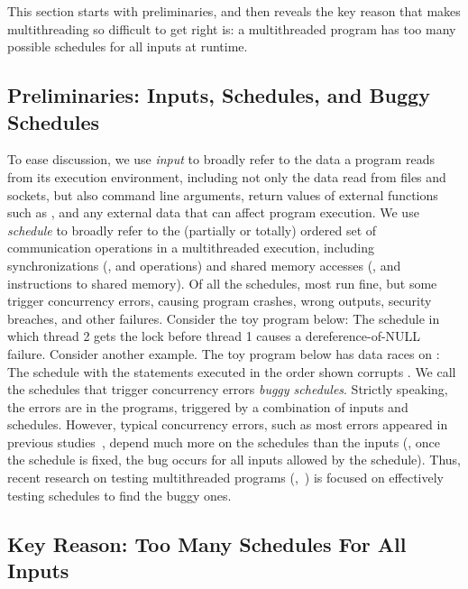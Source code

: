 This section starts with preliminaries, and then reveals the key reason that
makes multithreading so difficult to get right is: a multithreaded program has
too many possible schedules for all inputs at runtime.

\subsection{Preliminaries: Inputs, Schedules, and Buggy Schedules}

To ease discussion, we use \emph{input} to broadly refer to the data a
program reads from its execution environment, including not only the data
read from files and sockets, but also command line arguments, return
values of external functions such as , and any external data
that can affect program execution.  We use \emph{schedule} to broadly refer to
the (partially or totally) ordered set of communication operations in a
multithreaded execution, including synchronizations (\eg,  and
 operations) and shared memory accesses (\eg,  and
 instructions to shared memory). Of all the schedules, most run
fine, but some trigger concurrency errors, causing program crashes,
wrong outputs, security breaches, and other failures. Consider the toy program
below:  \noindent The schedule in which thread 2
gets the lock before thread 1 causes a dereference-of-NULL failure.  Consider
another example.  The toy program below has data races on :
 \noindent The schedule with the statements
executed in the order shown corrupts . We call the schedules that
trigger concurrency errors \emph{buggy schedules}.  Strictly speaking, the
errors are in the programs, triggered by a combination of inputs and schedules. 
However, typical concurrency errors, such as most errors appeared in previous
studies~\cite{lu:concurrency-bugs,con:hotpar12}, depend much more on the
schedules than the inputs (\eg, once the schedule is fixed, the bug
occurs for all inputs allowed by the schedule).  Thus, recent research on
testing multithreaded programs (\eg,~\cite{musuvathi:chess:osdi08}) is
focused on effectively testing schedules to find the buggy ones.

\subsection{Key Reason: Too Many Schedules For All Inputs}

